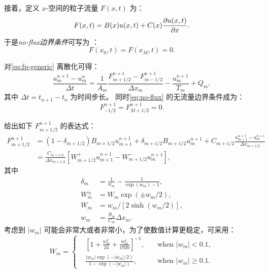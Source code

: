 接着，定义 $x$-空间的粒子流量 $F(x,t)$ 为：
\begin{equation}
  \label{eq:fp-f}
  F(x,t) = B(x) u(x,t) + C(x) \frac{\partial u(x,t)}{\partial x} .
\end{equation}
于是\emph{\ac{no-flux}边界条件}可写为 \cite{park1995}：
\begin{equation}
  \label{eq:no-flux}
  F(x_0, t) = F(x_M, t) = 0 .
\end{equation}

对\autoref{eq:fp-generic} 离散化可得：
\begin{equation}
  \label{eq:fp-disc}
  \frac{u_m^{n+1} - u_m^n}{\Delta t}
    = \frac{1}{A_m} \frac{F_{m+1/2}^{n+1} - F_{m-1/2}^{n+1}}{\Delta x_m}
      - \frac{u_m^{n+1}}{T_m} + Q_m ,
\end{equation}
其中 $\Delta t = t_{n+1} - t_n$ 为时间步长。
同时\autoref{eq:no-flux} 的无流量边界条件成为：
\begin{equation}
  \label{eq:no-flux-disc}
  F_{-1/2}^{n+1} = F_{M+1/2}^{n+1} = 0 .
\end{equation}

 给出如下 $F_{m+1/2}^{n+1}$ 的表达式：
\begin{align}
  \label{eq:fp-f-chang70}
  F_{m+1/2}^{n+1} & = (1 - \delta_{m+1/2}) B_{m+1/2} u_{m+1}^{n+1}
      + \delta_{m+1/2} B_{m+1/2} u_m^{n+1}
      + C_{m+1/2} \frac{u_{m+1}^{n+1} - u_m^{n+1}}{\Delta x_{m+1/2}} \\
    & = \frac{C_{m+1/2}}{\Delta x_{m+1/2}} \left[
      W_{m+1/2}^{+} u_{m+1}^{n+1} - W_{m+1/2}^{-} u_m^{n+1} \right] ,
\end{align}
其中
\begin{align}
  \delta_m & = \frac{1}{w_m} - \frac{1}{\exp(w_m) - 1} ,
    \label{eq:fp-delta-m} \\
  W_m^{\pm} & = W_m \exp(\pm w_m / 2) ,
    \label{eq:fp-Wm-pm} \\
  W_m & = w_m \big/ [2 \sinh(w_m / 2)] ,
    \label{eq:fp-Wm} \\
  w_m & = \frac{B_m}{C_m} \Delta x_m .
    \label{eq:fp-wm}
\end{align}
考虑到 $|w_m|$ 可能会非常大或者非常小，为了使数值计算更稳定，可采用\cite{park1996}：
\begin{equation}
  \label{eq:fp-Wm-calc}
  W_m = \left\{
    \begin{alignedat}{2}
      & \left[ 1 + \frac{w_m^2}{24} + \frac{w_m^4}{1920} \right]^{-1} ,
        & \quad\text{when~} |w_m| < 0.1 , \\
      & \frac{|w_m| \exp(-|w_m|/2)}{1 - \exp(-|w_m|)} ,
        & \quad\text{when~} |w_m| \ge 0.1 .
    \end{alignedat}
  \right.
\end{equation}

